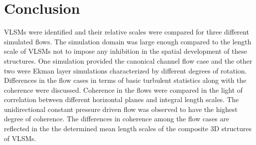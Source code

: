 
\section{Conclusion}
VLSMs were identified and their relative scales were compared for three different simulated flows. The simulation domain was large enough compared to the length scale of VLSMs not to impose any inhibition in the spatial development of these structures. One simulation provided the canonical channel flow case and the other two were Ekman layer simulations characterized by different degrees of rotation. Differences in the flow cases in terms of basic turbulent statistics along with the coherence were discussed. Coherence in the flows were compared in the light of correlation between different horizontal planes and integral length scales. The unidirectional constant pressure driven flow was observed to have the highest degree of coherence. The differences in coherence among the flow cases are reflected in the the determined mean length scales of the composite 3D structures of VLSMs.

